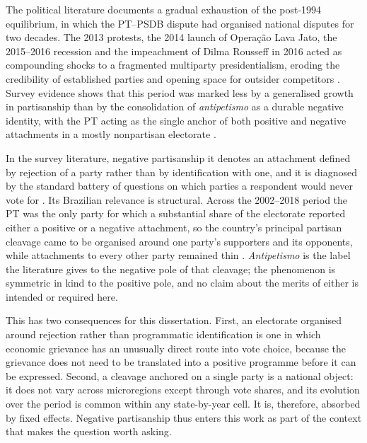 \documentclass[
	11pt,				%
	oneside,			%
	a4paper,			%
	english,			%
	english				%
	]{abntex2ppgsi}
\theoremstyle{plain}
\theoremstyle{remark}
\theoremstyle{plain}%
\theoremstyle{remark}%
\begin{document}
The political literature documents a gradual
exhaustion of the post-1994 equilibrium, in which the PT--PSDB dispute
had organised national disputes for two decades. The 2013 protests,
the 2014 launch of Operação Lava Jato, the 2015--2016 recession and
the impeachment of Dilma Rousseff in 2016 acted as compounding shocks
to a fragmented multiparty presidentialism, eroding the credibility
of established parties and opening space for outsider competitors
\cite{melloespektor2018,hunter}. Survey evidence shows
that this period was marked less by a generalised growth in
partisanship than by the consolidation of \emph{antipetismo} as a
durable negative identity, with the PT acting as the single anchor of
both positive and negative attachments in a mostly nonpartisan
electorate \cite{samuelszucco2018,renno2020}.

In the survey literature, negative partisanship it denotes an attachment defined by rejection of a party rather than
by identification with one, and it is diagnosed by the standard battery of
questions on which parties a respondent would never vote for
\cite{samuelszucco2018}. Its Brazilian relevance is structural. Across the
2002--2018 period the PT was the only party for which a substantial share of the
electorate reported either a positive or a negative attachment, so the country's
principal partisan cleavage came to be organised around one party's supporters
and its opponents, while attachments to every other party remained thin
\cite{samuelszucco2018,renno2020}. \emph{Antipetismo} is the label the
literature gives to the negative pole of that cleavage; the phenomenon is
symmetric in kind to the positive pole, and no claim about the merits of either
is intended or required here.

This has two consequences for this dissertation. First, an electorate organised
around rejection rather than programmatic identification is one in which
economic grievance has an unusually direct route into vote choice, because the
grievance does not need to be translated into a positive programme before it can
be expressed. Second, a cleavage anchored on a single
party is a national object: it does not vary across microregions except
through vote shares, and its evolution over the period is common within any
state-by-year cell. It is, therefore, absorbed by fixed effects. Negative partisanship
thus enters this work as part of the context that makes the question worth
asking.
\end{document}

